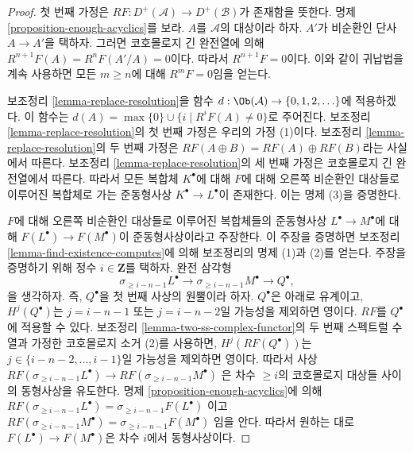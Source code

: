 \begin{proof}
첫 번째 가정은
$RF : D^+(\mathcal{A}) \to D^+(\mathcal{B})$가 존재함을 뜻한다.
명제 \ref{proposition-enough-acyclics}를 보라.
$A$를 $\mathcal{A}$의 대상이라 하자. $A'$가 비순환인 단사
$A \to A'$을 택하자. 그러면 코호몰로지 긴 완전열에 의해
$R^{n + 1}F(A) = R^nF(A'/A) = 0$이다.
따라서 $R^{n + 1}F = 0$이다. 이와 같이 귀납법을 계속 사용하면
모든 $m \geq n$에 대해 $R^mF = 0$임을 얻는다.

\medskip\noindent
보조정리 \ref{lemma-replace-resolution}을 함수
$d : \Ob(\mathcal{A}) \to \{0, 1, 2, \ldots \}$에 적용하겠다.
이 함수는 $d(A) = \max \{0\} \cup \{i \mid R^iF(A) \not = 0\}$로
주어진다. 보조정리 \ref{lemma-replace-resolution}의 첫 번째 가정은
우리의 가정 (1)이다. 보조정리 \ref{lemma-replace-resolution}의
두 번째 가정은
$RF(A \oplus B) = RF(A) \oplus RF(B)$라는 사실에서 따른다.
보조정리 \ref{lemma-replace-resolution}의 세 번째 가정은
코호몰로지 긴 완전열에서 따른다. 따라서 모든 복합체
$K^\bullet$에 대해 $F$에 대해 오른쪽 비순환인 대상들로 이루어진
복합체로 가는 준동형사상 $K^\bullet \to L^\bullet$이 존재한다.
이는 명제 (3)을 증명한다.

\medskip\noindent
$F$에 대해 오른쪽 비순환인 대상들로 이루어진 복합체들의 준동형사상
$L^\bullet \to M^\bullet$에 대해
$F(L^\bullet) \to F(M^\bullet)$이 준동형사상이라고 주장한다.
이 주장을 증명하면 보조정리 \ref{lemma-find-existence-computes}에 의해
보조정리의 명제 (1)과 (2)를 얻는다. 주장을 증명하기 위해 정수
$i \in \mathbf{Z}$를 택하자. 완전 삼각형
$$
\sigma_{\geq i - n - 1}L^\bullet \to
\sigma_{\geq i - n - 1}M^\bullet \to Q^\bullet,
$$
을 생각하자. 즉, $Q^\bullet$을 첫 번째 사상의 원뿔이라 하자.
$Q^\bullet$은 아래로 유계이고, $H^j(Q^\bullet)$는
$j = i - n - 1$ 또는 $j = i - n - 2$일 가능성을 제외하면 영이다.
$RF$를 $Q^\bullet$에 적용할 수 있다. 보조정리
\ref{lemma-two-ss-complex-functor}의 두 번째 스펙트럴 수열과
가정한 코호몰로지 소거 (2)를 사용하면,
$H^j(RF(Q^\bullet))$는
$j \in \{i - n - 2, \ldots, i - 1\}$일 가능성을 제외하면 영이다.
따라서 사상
$RF(\sigma_{\geq i - n - 1}L^\bullet) \to RF(\sigma_{\geq i - n - 1}M^\bullet)$
은 차수 $\geq i$의 코호몰로지 대상들 사이의 동형사상을 유도한다.
명제 \ref{proposition-enough-acyclics}에 의해
$RF(\sigma_{\geq i - n - 1}L^\bullet) = \sigma_{\geq i - n - 1}F(L^\bullet)$
이고
$RF(\sigma_{\geq i - n - 1}M^\bullet) = \sigma_{\geq i - n - 1}F(M^\bullet)$
임을 안다. 따라서 원하는 대로
$F(L^\bullet) \to F(M^\bullet)$은 차수 $i$에서 동형사상이다.


\end{proof}
